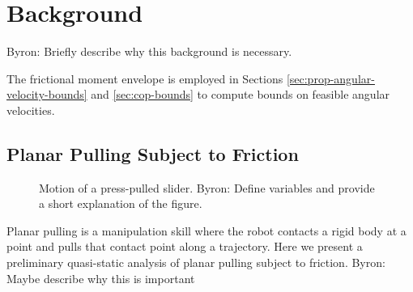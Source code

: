 \documentclass[conference]{IEEEtran}
\newcommand{\BB}[1]{{\color{red} {Byron: {#1}}}}
\begin{document}
\section{Background}\label{sec:background}
\BB{Briefly describe why this background is necessary. }

The frictional moment envelope is employed in Sections
\ref{sec:prop-angular-velocity-bounds} and \ref{sec:cop-bounds} to
compute bounds on feasible angular velocities.

\subsection{Planar Pulling Subject to Friction}\label{sec:planar-pulling}

\begin{figure}[t]
  \centering
  \def\iangle{35} %
  \caption{Motion of a press-pulled slider. \BB{Define variables and provide a short explanation of the figure.}}
  \label{fig:presspull-motion}
\end{figure}


 Planar pulling is a manipulation skill where
the robot contacts a rigid body at a point and pulls that contact
point along a trajectory. Here we present a preliminary quasi-static analysis of planar pulling
subject to friction. \BB{Maybe describe why this is important}
\end{document}
